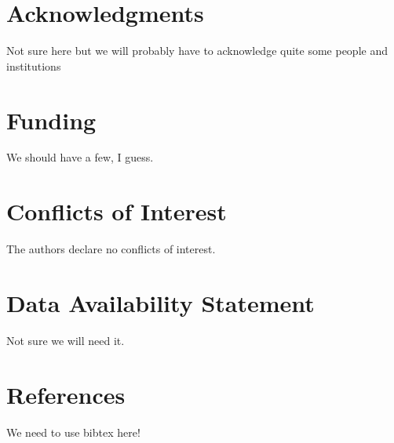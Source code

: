 \documentclass[12pt,a4paper]{article}
\begin{document}
\section*{Acknowledgments}

Not sure here but we will probably have to acknowledge quite some people and institutions

\section*{Funding}

We should have a few, I guess.

\section*{Conflicts of Interest}

The authors declare no conflicts of interest.


\section*{Data Availability Statement}

Not sure we will need it.



\section{References}
We need to use bibtex here!
\end{document}

